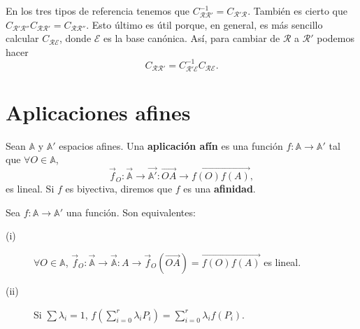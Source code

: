 \begin{observation}
En los tres tipos de referencia tenemos que $\displaystyle C^{-1}_{\mathcal{R}\mathcal{R}'} = C_{\mathcal{R}'\mathcal{R}} $. También es cierto que $\displaystyle C_{\mathcal{R}'\mathcal{R}''} C_{\mathcal{R}\mathcal{R}'} = C_{\mathcal{R}\mathcal{R}''} $. Esto último es útil porque, en general, es más sencillo calcular $\displaystyle C_{\mathcal{R}\mathcal{E}} $, donde $\displaystyle \mathcal{E} $ es la base canónica. Así, para cambiar de $\displaystyle \mathcal{R} $ a $\displaystyle \mathcal{R}' $ podemos hacer
\[C_{\mathcal{R}\mathcal{R}'} = C_{\mathcal{R}'\mathcal{E}}^{-1}C_{\mathcal{R}\mathcal{E}} .\]
\end{observation}
\section{Aplicaciones afines}
\begin{definition}
Sean $\displaystyle \mathbb{A} $ y $\displaystyle \mathbb{A}' $ espacios afines. Una \textbf{aplicación afín} es una función $\displaystyle f : \mathbb{A} \to \mathbb{A}' $ tal que $\displaystyle \forall O \in \mathbb{A} $,
\[\vec{f}_{O} : \vec{\mathbb{A}} \to \vec{\mathbb{A}'} : \overrightarrow{OA} \to \overrightarrow{f\left(O\right)f\left(A\right)} ,\]
es lineal. Si $\displaystyle f $ es biyectiva, diremos que $\displaystyle f $ es una \textbf{afinidad}.
\end{definition}
\begin{prop}
Sea $\displaystyle f : \mathbb{A} \to \mathbb{A}' $ una función. Son equivalentes:
\begin{description}
\item[(i)] $\displaystyle \forall O \in \mathbb{A} $, $\displaystyle \vec{f}_{O} : \vec{\mathbb{A}} \to \vec{\mathbb{A}} : A \to \vec{f}_{O}\left(\overrightarrow{OA}\right) = \overrightarrow{f\left(O\right)f\left(A\right)} $ es lineal.
\item[(ii)] Si $\displaystyle \sum \lambda_{i} = 1 $, $\displaystyle f\left(\sum^{r}_{i= 0}\lambda_{i}P_{i}\right) = \sum^{r}_{i= 0}\lambda_{i}f\left(P_{i}\right) $.
\end{description}
\end{prop}
